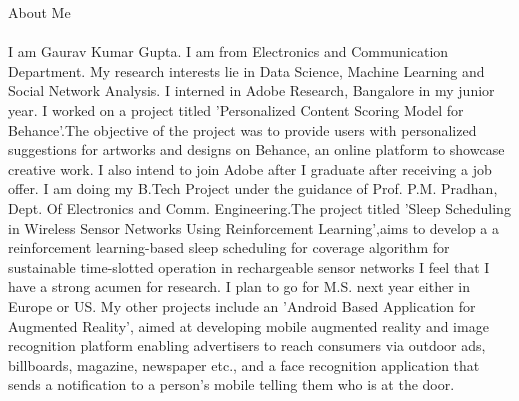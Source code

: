 \documentclass[11pt]{article}
\begin{document}
\begin{section}{About Me}
\paragraph{}I am Gaurav Kumar Gupta. I am from Electronics and Communication Department. My research interests lie in Data Science, Machine Learning and Social Network Analysis. I interned in Adobe Research, Bangalore in my junior year. I worked on a project titled 'Personalized Content Scoring Model for Behance'.The objective of the project was to provide users with personalized suggestions for artworks and designs on Behance, an online platform to showcase creative work. I also intend to join Adobe after I graduate after receiving a job offer. I am doing my B.Tech Project under the guidance of Prof. P.M. Pradhan, Dept. Of Electronics and Comm. Engineering.The project titled 'Sleep Scheduling in Wireless Sensor Networks Using Reinforcement Learning',aims to develop a a reinforcement learning-based sleep scheduling for coverage algorithm for sustainable time-slotted operation in rechargeable sensor networks I feel that I have a strong acumen for research. I plan to go for M.S. next year either in Europe or US. My other projects include an 'Android Based Application for Augmented Reality', aimed at developing mobile augmented reality and image recognition platform enabling advertisers to reach consumers
via outdoor ads, billboards, magazine, newspaper etc., and a face recognition application that sends a notification to a person's mobile telling them who is at the door. 

\end{section}
\end{document}
